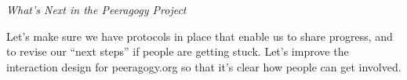 \begin{refsection}
\FloatBarrier

\begin{framed}
\noindent 
\emph{What's Next in the Peeragogy Project}
\begin{collectinmacro}{\WrapperWN}{}{}
Let's make sure we have protocols in place that enable us to share
progress, and to revise our ``next steps'' if people are getting
stuck.  Let's improve the interaction design for peeragogy.org so that
it's clear how people can get involved.
\end{collectinmacro}
\WrapperWN
\end{framed}    

\printbibliography[heading=subbibliography]
\end{refsection}



